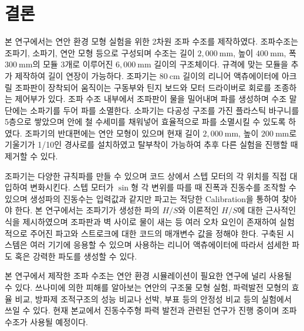 \section{결론}

본 연구에서는 연안 환경 모형 실험을 위한 2차원 조파 수조를 제작하였다. 조파수조는 조파기, 소파기, 연안 모형 등으로 구성되며 수조는 길이 $2,000~\mathrm{mm}$, 높이 $400~\mathrm{mm}$, 폭 $300~\mathrm{mm}$의 모듈 3개로 이루어진 $6,000~\mathrm{mm}$ 길이의 구조체이다. 규격에 맞는 모듈을 추가 제작하여 길이 연장이 가능하다. 조파기는 $80~\mathrm{cm}$ 길이의 리니어 액츄에이터에 아크릴 조파판이 장착되어 움직이는 구동부와 틴지 보드와 모터 드라이버로 회로를 조종하는 제어부가 있다. 조파 수조 내부에서 조파판이 물을 밀어내며 파를 생성하며 수조 말단에는 소파기를 두어 파를 소멸한다. 소파기는 다공성 구조를 가진 플라스틱 바구니를 5층으로 쌓았으며 안에 철 수세미를 채워넣어 효율적으로 파를 소멸시킬 수 있도록 하였다. 조파기의 반대편에는 연안 모형이 있으며 현재 길이 $2,000~\mathrm{mm}$, 높이 $200~\mathrm{mm}$로 기울기가 1/10인 경사로를 설치하였고 탈부착이 가능하여 추후 다른 실험을 진행할 때 제거할 수 있다.

조파기는 다양한 규칙파를 만들 수 있으며 코드 상에서 스텝 모터의 각 위치를 직접 대입하여 변화시킨다. 스텝 모터가 $\sin$형 각 변위를 따를 때 진폭과 진동수를 조작할 수 있으며 생성파의 진동수는 입력값과 같지만 파고는 적당한 Calibration을 통하여 찾아야 한다. 본 연구에서는 조파기가 생성한 파의 $H/S$와 이론적인 $H/S$에 대한 근사적인 식을 제시하였으며 조파판과 벽 사이로 물이 새는 등 여러 오차 요인이 존재하여 실험적으로 주어진 파고와 스트로크에 대한 코드의 매개변수 값을 정해야 한다. 구축된 시스템은 여러 기기에 응용할 수 있으며 사용하는 리니어 액츄에이터에 따라서 섬세한 파도 혹은 강력한 파도를 생성할 수 있다.

본 연구에서 제작한 조파 수조는 연안 환경 시뮬레이션이 필요한 연구에 널리 사용될 수 있다. 쓰나미에 의한 피해를 알아보는 연안의 구조물 모형 실험, 파력발전 모형의 효율 비교, 방파제 조적구조의 성능 비교나 선박, 부표 등의 안정성 비교 등의 실험에서 쓰일 수 있다. 현재 본교에서 진동수주형 파력 발전과 관련된 연구가 진행 중이며 조파 수조가 사용될 예정이다.